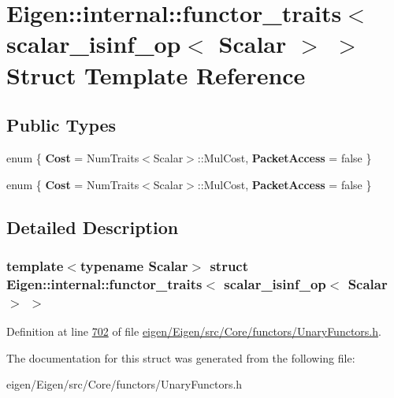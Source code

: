 \hypertarget{struct_eigen_1_1internal_1_1functor__traits_3_01scalar__isinf__op_3_01_scalar_01_4_01_4}{}\section{Eigen\+:\+:internal\+:\+:functor\+\_\+traits$<$ scalar\+\_\+isinf\+\_\+op$<$ Scalar $>$ $>$ Struct Template Reference}
\label{struct_eigen_1_1internal_1_1functor__traits_3_01scalar__isinf__op_3_01_scalar_01_4_01_4}
\subsection*{Public Types}
\begin{DoxyCompactItemize}
\item 
\mbox{\label{struct_eigen_1_1internal_1_1functor__traits_3_01scalar__isinf__op_3_01_scalar_01_4_01_4_a5474323e54803b05e6d19f62cfc6e85e}} 
enum \{ {\bfseries Cost} = Num\+Traits$<$Scalar$>$\+:\+:Mul\+Cost, 
{\bfseries Packet\+Access} = false
 \}
\item 
\mbox{\label{struct_eigen_1_1internal_1_1functor__traits_3_01scalar__isinf__op_3_01_scalar_01_4_01_4_aead583b6f9f7cc19a88a858dfc8bd0fa}} 
enum \{ {\bfseries Cost} = Num\+Traits$<$Scalar$>$\+:\+:Mul\+Cost, 
{\bfseries Packet\+Access} = false
 \}
\end{DoxyCompactItemize}


\subsection{Detailed Description}
\subsubsection*{template$<$typename Scalar$>$\newline
struct Eigen\+::internal\+::functor\+\_\+traits$<$ scalar\+\_\+isinf\+\_\+op$<$ Scalar $>$ $>$}



Definition at line \hyperlink{eigen_2_eigen_2src_2_core_2functors_2_unary_functors_8h_source_l00702}{702} of file \hyperlink{eigen_2_eigen_2src_2_core_2functors_2_unary_functors_8h_source}{eigen/\+Eigen/src/\+Core/functors/\+Unary\+Functors.\+h}.



The documentation for this struct was generated from the following file\+:\begin{DoxyCompactItemize}
\item 
eigen/\+Eigen/src/\+Core/functors/\+Unary\+Functors.\+h\end{DoxyCompactItemize}
